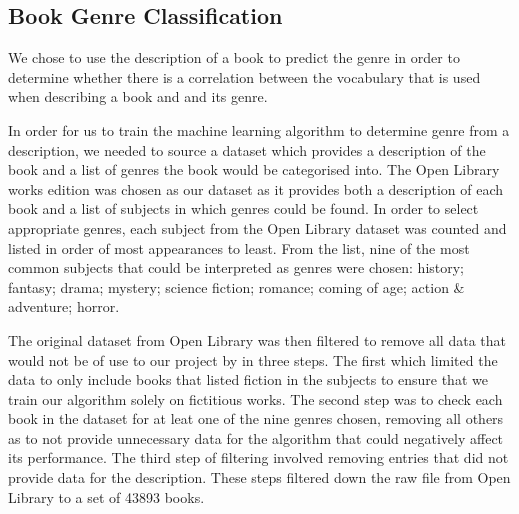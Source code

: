 \documentclass[twocolumn,pra,floatfix]{revtex4-2}
\begin{document}
        \subsection{Book Genre Classification}

            We chose to use the description of a book to predict the genre in order to determine whether there is a correlation between the vocabulary that is used when describing a book and and its genre. 
    
            In order for us to train the machine learning algorithm to determine genre from a description, we needed to source a dataset which provides a description of the book and a list of genres the book would be categorised into. The Open Library works edition\cite{openlibrary2025-fullworks} was chosen as our dataset as it provides both a description of each book and a list of subjects in which genres could be found. In order to select appropriate genres, each subject from the Open Library dataset was counted and listed in order of most appearances to least. From the list, nine of the most common subjects that could be interpreted as genres were chosen: history; fantasy; drama; mystery; science fiction; romance; coming of age; action \& adventure; horror. 

            The original dataset from Open Library was then filtered to remove all data that would not be of use to our project by in three steps. The first which limited the data to only include books that listed fiction in the subjects to ensure that we train our algorithm solely on fictitious works. The second step was to check each book in the dataset for at leat one of the nine genres chosen, removing all others as to not provide unnecessary data for the algorithm that could negatively affect its performance. The third step of filtering involved removing entries that did not provide data for the description. These steps filtered down the raw file from Open Library to a set of 43893 books.
\end{document}
